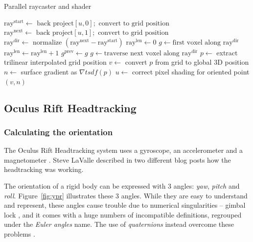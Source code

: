 \documentclass[12pt, twoside]{article}
\begin{document}
\begin{algorithm}
\caption{Parallel raycaster and shader}\label{algo3}
\begin{algorithmic}[1]
  \State $\text{ray}^{\text{start}} \gets \text{ back project} [u,0]; \text{ convert to grid position}$
  \State $\text{ray}^{\text{next}} \gets \text{ back project} [u,1]; \text{ convert to grid position}$
  \State $\text{ray}^{\text{dir}} \gets \text{ normalize }(\text{ray}^{\text{next}}-\text{ray}^{\text{start}})$
  \State $\text{ray}^{\text{len}} \gets 0$
  \State $g \gets \text{first voxel along } \text{ray}^{\text{dir}}$
    \State $\text{ray}^{\text{len}} \gets \text{ray}^{\text{len}} + 1$
    \State $g^{\text{prev}} \gets g$
    \State $g \gets \text{traverse next voxel along }\text{ray}^{\text{dir}}$
      \State $p \gets$ extract trilinear interpolated grid position
      \State $v \gets$ convert $p$ from grid to global 3D position
      \State $n \gets$ surface gradient as $\nabla tsdf(p)$
      \State $u \gets$ correct pixel shading for oriented point $(v,n)$
      \EndIf
    \EndWhile
\EndFor
\end{algorithmic}
\end{algorithm}

\subsection{Oculus Rift Headtracking}
\subsubsection{Calculating the orientation}
The Oculus Rift Headtracking system uses a gyroscope, an accelerometer and a magnetometer \cite{Oculus2}. Steve LaValle described in two different blog posts \cite{OculusBlog1, OculusBlog2} how the headtracking was working.

The orientation of a rigid body can be expressed with 3 angles: \textit{yaw}, \textit{pitch} and \textit{roll}. Figure~\ref{fig:ypr} illustrates these 3 angles. While they are easy to understand and represent, these angles cause trouble due to numerical singularities -- gimbal lock \cite{lock}, and it comes with a huge numbers of incompatible definitions, regrouped under the \textit{Euler angles} name. The use of \textit{quaternions} instead overcome these problems \cite{Quat}.
\end{document}
